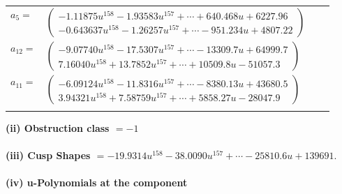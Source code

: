 \documentclass[1p]{elsarticle_modified}
\theoremstyle{definition}
\begin{document}
\begin{tabular}{m{7pt} m{180pt} m{7pt} m{180pt} }
\flushright $a_{5}=$&$\begin{pmatrix}-1.11875 u^{158}-1.93583 u^{157}+\cdots+640.468 u+6227.96\\-0.643637 u^{158}-1.26257 u^{157}+\cdots-951.234 u+4807.22\end{pmatrix}$ \\
\flushright $a_{12}=$&$\begin{pmatrix}-9.07740 u^{158}-17.5307 u^{157}+\cdots-13309.7 u+64999.7\\7.16040 u^{158}+13.7852 u^{157}+\cdots+10509.8 u-51057.3\end{pmatrix}$ \\
\flushright $a_{11}=$&$\begin{pmatrix}-6.09124 u^{158}-11.8316 u^{157}+\cdots-8380.13 u+43680.5\\3.94321 u^{158}+7.58759 u^{157}+\cdots+5858.27 u-28047.9\end{pmatrix}$\\&\end{tabular}
\flushleft \textbf{(ii) Obstruction class $= -1$}\\~\\
\flushleft \textbf{(iii) Cusp Shapes $= -19.9314 u^{158}-38.0090 u^{157}+\cdots-25810.6 u+139691.$}\\~\\
\newpage\renewcommand{\arraystretch}{1}
\flushleft \textbf{(iv) u-Polynomials at the component}\newline \\
\end{document}
